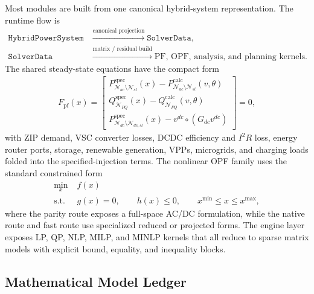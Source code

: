 Most modules are built from one canonical hybrid-system representation.  The
runtime flow is
\begin{align}
\texttt{HybridPowerSystem}
&\xrightarrow{\text{canonical projection}} \texttt{SolverData}, \\
\texttt{SolverData}
&\xrightarrow{\text{matrix / residual build}}
\text{PF, OPF, analysis, and planning kernels}.
\end{align}
The shared steady-state equations have the compact form
\begin{align}
F_{\mathrm{pf}}(x) =
\begin{bmatrix}
P^{\mathrm{spec}}_{\mathcal{N}_{ac}\setminus\mathcal{N}_{sl}}(x)-P^{\mathrm{calc}}_{\mathcal{N}_{ac}\setminus\mathcal{N}_{sl}}(v,\theta) \\
Q^{\mathrm{spec}}_{\mathcal{N}_{PQ}}(x)-Q^{\mathrm{calc}}_{\mathcal{N}_{PQ}}(v,\theta) \\
P^{\mathrm{spec}}_{\mathcal{N}_{dc}\setminus\mathcal{N}_{dc,sl}}(x)-v^{dc}\circ (G_{dc}v^{dc})
\end{bmatrix}=0,
\end{align}
with ZIP demand, VSC converter losses, DCDC efficiency and \(I^2R\) loss, energy
router ports, storage, renewable generation, VPPs, microgrids, and charging
loads folded into the specified-injection terms.  The nonlinear OPF family uses
the standard constrained form
\begin{align}
\min_x\;& f(x) \\
\mathrm{s.t.}\;& g(x)=0,\qquad h(x)\le 0,\qquad x^{\min}\le x\le x^{\max},
\end{align}
where the parity route exposes a full-space AC/DC formulation, while the native
route and fast route use specialized reduced or projected forms.  The engine
layer exposes LP, QP, NLP, MILP, and MINLP kernels that all reduce to sparse
matrix models with explicit bound, equality, and inequality blocks.

\subsection{Mathematical Model Ledger}

